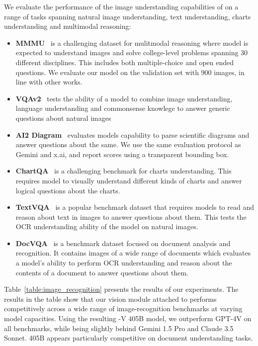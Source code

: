 \documentclass[dvipsnames]{fairmeta}
\begin{document}
We evaluate the performance of the image understanding capabilities of \llamathree on a range of tasks spanning natural image understanding, text understanding, charts understanding and multimodal reasoning:
\begin{itemize}
\item \textbf{MMMU}~\citep{yue2023mmmu} is a challenging dataset for mulitmodal reasoning where model is expected to understand
images and solve college-level problems spanning 30 different disciplines. This includes both multiple-choice and open ended
questions. We evaluate our model on the validation set with 900 images, in line with other works.

\item \textbf{VQAv2}~\citep{vqav2} tests the ability of a model to combine image understanding, language understanding and
commonsense knowlege to answer generic questions about natural images

\item \textbf{AI2 Diagram}~\citep{Kembhavi2016ADI} evaluates models capability to parse scientific diagrams
and answer questions about the same. We use the same evaluation protocol as Gemini and x.ai, and report scores using a transparent bounding box.

\item \textbf{ChartQA}~\citep{masry-etal-2022-chartqa} is a challenging benchmark for charts understanding. This requires
model to visually understand different kinds of charts and answer logical questions about the charts.

\item \textbf{TextVQA}~\citep{singh2019towards} is a popular benchmark dataset that requires
models to read and reason about text in images to answer questions about them. This tests the
OCR understanding ability of the model on natural images.

\item \textbf{DocVQA}~\citep{Mathew2020DocVQAAD} is a benchmark dataset focused on document analysis and recognition.
It contains images of a wide range of documents which evaluates a model's ability to perform OCR understanding
and reason about the contents of a document to answer questions about them.
\end{itemize}

Table~\ref{table:image_recognition} presents the results of our experiments.
The results in the table show that our vision module attached to \llamathree performs competitively across a wide range of image-recognition benchmarks at varying model capacities.
Using the resulting \llamathree-V 405B model, we outperform GPT-4V on all benchmarks, while being slightly behind Gemini 1.5 Pro and Claude 3.5 Sonnet.
\llamathree 405B appears particularly competitive on document understanding tasks.
\end{document}
